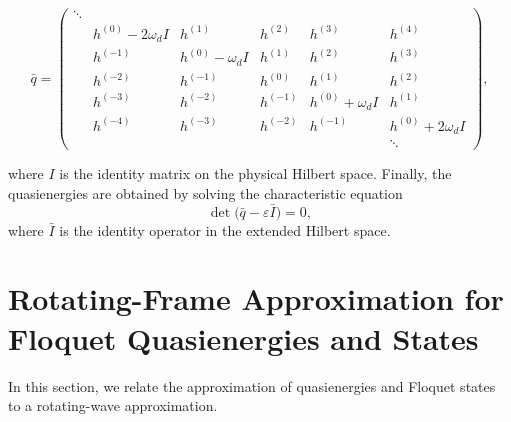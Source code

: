 \begin{appendices}
\begin{widetext}
\begin{equation}
    \bar{q} = \begin{pmatrix}
    \ddots & & & & & \\
     & h^{(0)}-2\omega_d I & h^{(1)} & h^{(2)}  & h^{(3)} & h^{(4)}  \\
     & h^{(-1)}            & h^{(0)}-\omega_d I & h^{(1)} & h^{(2)} & h^{(3)}  \\
     & h^{(-2)}            & h^{(-1)}  & h^{(0)}    & h^{(1)} & h^{(2)}  \\
     & h^{(-3)}            & h^{(-2)}  & h^{(-1)}   & h^{(0)}+\omega_d I & h^{(1)} \\
     & h^{(-4)}            & h^{(-3)}  & h^{(-2)}   & h^{(-1)} & h^{(0)}+2\omega_d I \\
     & & & & & \ddots
    \end{pmatrix},
\end{equation}
\end{widetext}
where $I$ is the identity matrix on the physical Hilbert space. Finally, the quasienergies are obtained by solving the characteristic equation
\begin{equation}
    \det\bigl(\bar{q}-\varepsilon \bar{I}\bigr)=0,
\end{equation}
where $\bar{I}$ is the identity operator in the extended Hilbert space.

\section{Rotating-Frame Approximation for Floquet Quasienergies and States}

In this section, we relate the approximation of quasienergies and Floquet states to a rotating-wave approximation.


\end{appendices}
